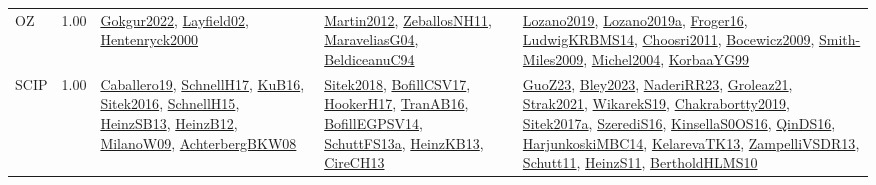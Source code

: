 {\begin{longtable}{p{3cm}r>{\raggedright\arraybackslash}p{6cm}>{\raggedright\arraybackslash}p{6cm}>{\raggedright\arraybackslash}p{8cm}}
\index{OZ}\index{CPSystems!OZ}OZ &  1.00 & \hyperref[detail:Gokgur2022]{Gokgur2022}, \hyperref[detail:Layfield02]{Layfield02}, \hyperref[detail:Hentenryck2000]{Hentenryck2000} & \hyperref[detail:Martin2012]{Martin2012}, \hyperref[detail:ZeballosNH11]{ZeballosNH11}, \hyperref[detail:MaraveliasG04]{MaraveliasG04}, \hyperref[detail:BeldiceanuC94]{BeldiceanuC94} & \hyperref[detail:Lozano2019]{Lozano2019}, \hyperref[detail:Lozano2019a]{Lozano2019a}, \hyperref[detail:Froger16]{Froger16}, \hyperref[detail:LudwigKRBMS14]{LudwigKRBMS14}, \hyperref[detail:Choosri2011]{Choosri2011}, \hyperref[detail:Bocewicz2009]{Bocewicz2009}, \hyperref[detail:Smith-Miles2009]{Smith-Miles2009}, \hyperref[detail:Michel2004]{Michel2004}, \hyperref[detail:KorbaaYG99]{KorbaaYG99}\\
\index{SCIP}\index{CPSystems!SCIP}SCIP &  1.00 & \hyperref[detail:Caballero19]{Caballero19}, \hyperref[detail:SchnellH17]{SchnellH17}, \hyperref[detail:KuB16]{KuB16}, \hyperref[detail:Sitek2016]{Sitek2016}, \hyperref[detail:SchnellH15]{SchnellH15}, \hyperref[detail:HeinzSB13]{HeinzSB13}, \hyperref[detail:HeinzB12]{HeinzB12}, \hyperref[detail:MilanoW09]{MilanoW09}, \hyperref[detail:AchterbergBKW08]{AchterbergBKW08} & \hyperref[detail:Sitek2018]{Sitek2018}, \hyperref[detail:BofillCSV17]{BofillCSV17}, \hyperref[detail:HookerH17]{HookerH17}, \hyperref[detail:TranAB16]{TranAB16}, \hyperref[detail:BofillEGPSV14]{BofillEGPSV14}, \hyperref[detail:SchuttFS13a]{SchuttFS13a}, \hyperref[detail:HeinzKB13]{HeinzKB13}, \hyperref[detail:CireCH13]{CireCH13} & \hyperref[detail:GuoZ23]{GuoZ23}, \hyperref[detail:Bley2023]{Bley2023}, \hyperref[detail:NaderiRR23]{NaderiRR23}, \hyperref[detail:Groleaz21]{Groleaz21}, \hyperref[detail:Strak2021]{Strak2021}, \hyperref[detail:WikarekS19]{WikarekS19}, \hyperref[detail:Chakrabortty2019]{Chakrabortty2019}, \hyperref[detail:Sitek2017a]{Sitek2017a}, \hyperref[detail:SzerediS16]{SzerediS16}, \hyperref[detail:KinsellaS0OS16]{KinsellaS0OS16}, \hyperref[detail:QinDS16]{QinDS16}, \hyperref[detail:HarjunkoskiMBC14]{HarjunkoskiMBC14}, \hyperref[detail:KelarevaTK13]{KelarevaTK13}, \hyperref[detail:ZampelliVSDR13]{ZampelliVSDR13}, \hyperref[detail:Schutt11]{Schutt11}, \hyperref[detail:HeinzS11]{HeinzS11}, \hyperref[detail:BertholdHLMS10]{BertholdHLMS10}\\

\end{longtable}}
